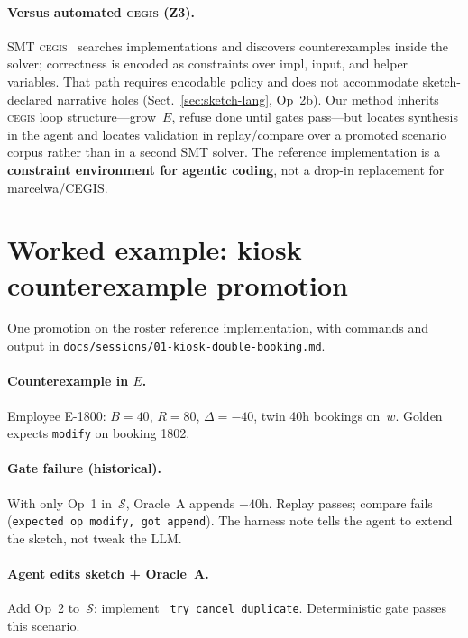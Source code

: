 \documentclass[11pt]{article}
\begin{document}
\paragraph{Versus automated \textsc{cegis} (Z3).}
SMT \textsc{cegis}~\cite{marcelwa2016cegis} searches implementations and discovers
counterexamples inside the solver; correctness is encoded as constraints over impl, input,
and helper variables. That path requires encodable policy and does not accommodate
sketch-declared narrative holes (Sect.~\ref{sec:sketch-lang}, Op~2b).
Our method inherits \textsc{cegis} loop structure---grow~$E$, refuse done until gates pass---but
locates synthesis in the agent and locates validation in replay/compare over a promoted scenario
corpus rather than in a second SMT solver. The reference implementation is a \textbf{constraint
environment for agentic coding}, not a drop-in replacement for marcelwa/CEGIS.

\section{Worked example: kiosk counterexample promotion}
\label{sec:case}

One promotion on the roster reference implementation, with commands and output in
\texttt{docs/sessions/01-kiosk-double-booking.md}.

\paragraph{Counterexample in $E$.}
Employee E-1800: $B=40$, $R=80$, $\Delta=-40$, twin 40h bookings on~$w$. Golden expects
\texttt{modify} on booking 1802.

\paragraph{Gate failure (historical).}
With only Op~1 in~$\mathcal{S}$, Oracle~A appends $-40$h. Replay passes; compare fails
(\texttt{expected op modify, got append}). The harness note tells the agent to extend
the sketch, not tweak the LLM.

\paragraph{Agent edits sketch + Oracle~A.}
Add Op~2 to~$\mathcal{S}$; implement \texttt{\_try\_cancel\_duplicate}. Deterministic gate
passes this scenario.
\end{document}
